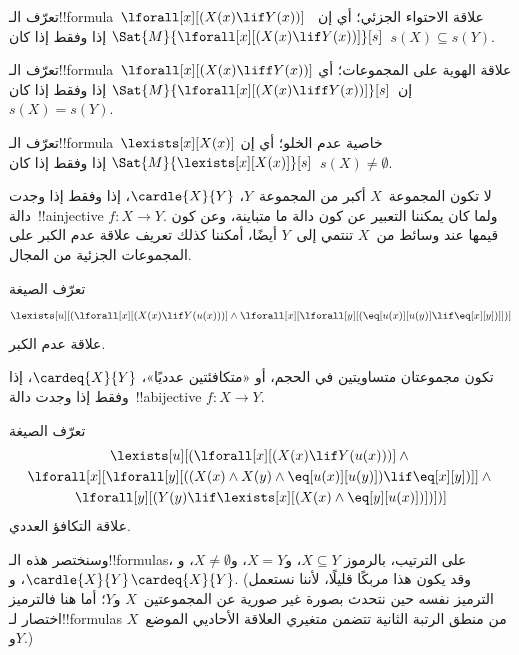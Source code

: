 \documentclass[../../../include/open-logic-section]{subfiles}
\begin{document}


\begin{prop}
تعرّف الـ!!{formula}~$\lforall[x][(X(x) \lif Y(x))]$ علاقة الاحتواء
الجزئي؛ أي إن~$\Sat{M}{\lforall[x][(X(x) \lif Y(x))]}[s]$ إذا وفقط
إذا كان~$s(X) \subseteq s(Y)$.
\end{prop}

\begin{prop}
تعرّف الـ!!{formula}~$\lforall[x][(X(x) \liff Y(x))]$ علاقة الهوية
على المجموعات؛ أي إن~$\Sat{M}{\lforall[x][(X(x) \liff Y(x))]}[s]$
إذا وفقط إذا كان~$s(X) = s(Y)$.
\end{prop}

\begin{prop}
تعرّف الـ!!{formula}~$\lexists[x][X(x)]$ خاصية عدم الخلو؛ أي إن
$\Sat{M}{\lexists[x][X(x)]}[s]$ إذا وفقط إذا كان~$s(X) \neq
\emptyset$.
\end{prop}

لا تكون المجموعة~$X$ أكبر من المجموعة~$Y$،
$\cardle{X}{Y}$، إذا وفقط إذا وجدت دالة~!!a{injective}
$f\colon X \to Y$. ولما كان يمكننا التعبير عن كون دالة ما متباينة، وعن
كون قيمها عند وسائط من~$X$ تنتمي إلى~$Y$ أيضًا، أمكننا كذلك تعريف
علاقة عدم الكبر على المجموعات الجزئية من المجال.

\begin{prop}
تعرّف الصيغة
\[
\lexists[u][(\lforall[x][(X(x) \lif Y(u(x)))] \land \lforall[x][\lforall[y][(\eq[u(x)][u(y)] \lif
      \eq[x][y])]])]
\]
علاقة عدم الكبر.
\end{prop}

تكون مجموعتان متساويتين في الحجم، أو «متكافئتين عدديًا»،
$\cardeq{X}{Y}$، إذا وفقط إذا وجدت دالة~!!a{bijective}
$f\colon X \to Y$.

\begin{prop}
تعرّف الصيغة
\begin{multline*}
  \lexists[u][(\lforall[x][(X(x) \lif Y(u(x)))] \land {}\\
    \lforall[x][\lforall[y][((X(x) \land X(y) \land \eq[u(x)][u(y)]) \lif \eq[x][y])]]
  \land {} \\\lforall[y][(Y(y) \lif \lexists[x][(X(x)
      \land \eq[y][u(x)])])])]
\end{multline*}
علاقة التكافؤ العددي.
\end{prop}

وسنختصر هذه الـ!!{formula}s، على الترتيب، بالرموز
$X \subseteq Y$، و$X = Y$، و$X \neq \emptyset$، و$\cardle{X}{Y}$،
و$\cardeq{X}{Y}$. (وقد يكون هذا مربكًا قليلًا، لأننا نستعمل الترميز
نفسه حين نتحدث بصورة غير صورية عن المجموعتين~$X$ و$Y$؛ أما هنا فالترميز
اختصار لـ!!{formula}s من منطق الرتبة الثانية تتضمن متغيري العلاقة
الأحاديي الموضع~$X$ و$Y$.)
\end{document}
